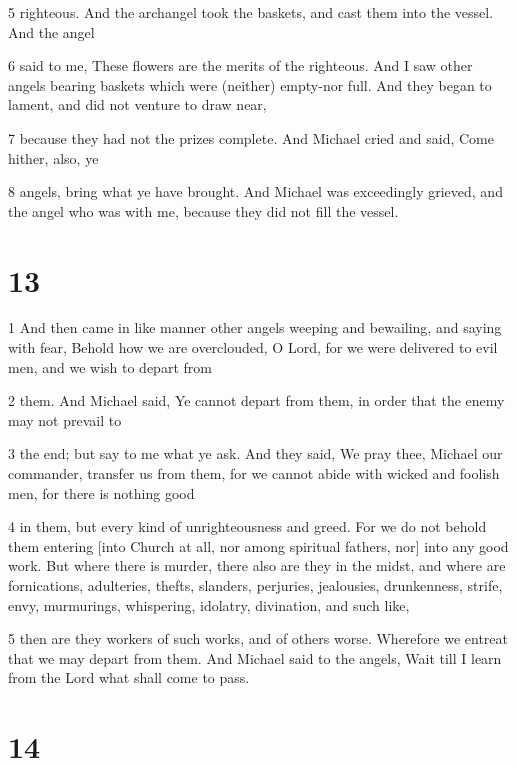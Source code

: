 \par 5 righteous. And the archangel took the baskets, and cast them into the vessel. And the angel

\par 6 said to me, These flowers are the merits of the righteous. And I saw other angels bearing baskets which were (neither) empty-nor full. And they began to lament, and did not venture to draw near,

\par 7 because they had not the prizes complete. And Michael cried and said, Come hither, also, ye

\par 8 angels, bring what ye have brought. And Michael was exceedingly grieved, and the angel who was with me, because they did not fill the vessel.

\chapter{13}

\par 1 And then came in like manner other angels weeping and bewailing, and saying with fear, Behold how we are overclouded, O Lord, for we were delivered to evil men, and we wish to depart from

\par 2 them. And Michael said, Ye cannot depart from them, in order that the enemy may not prevail to

\par 3 the end; but say to me what ye ask. And they said, We pray thee, Michael our commander, transfer us from them, for we cannot abide with wicked and foolish men, for there is nothing good

\par 4 in them, but every kind of unrighteousness and greed. For we do not behold them entering [into Church at all, nor among spiritual fathers, nor] into any good work. But where there is murder, there also are they in the midst, and where are fornications, adulteries, thefts, slanders, perjuries, jealousies, drunkenness, strife, envy, murmurings, whispering, idolatry, divination, and such like,

\par 5 then are they workers of such works, and of others worse. Wherefore we entreat that we may depart from them. And Michael said to the angels, Wait till I learn from the Lord what shall come to pass.

\chapter{14}

